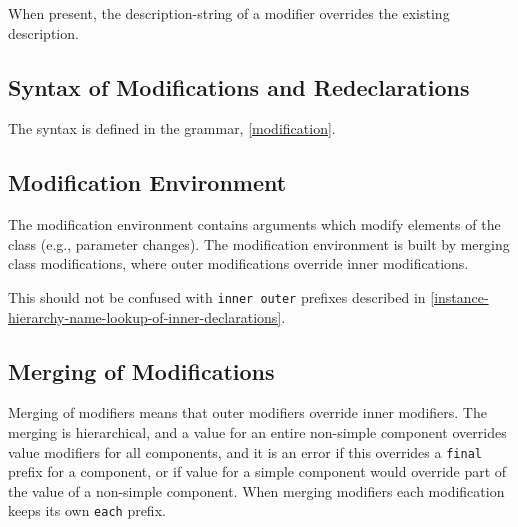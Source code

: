 When present, the description-string of a modifier overrides the existing description.

\subsection{Syntax of Modifications and Redeclarations}\label{syntax-of-modifications-and-redeclarations}

The syntax is defined in the grammar, \cref{modification}.

\subsection{Modification Environment}\label{modification-environment}

The modification environment contains arguments which modify elements of
the class (e.g., parameter changes). The modification environment is
built by merging class modifications, where outer modifications override
inner modifications.

\begin{nonnormative}
This should not be confused with \lstinline!inner outer! prefixes described in \cref{instance-hierarchy-name-lookup-of-inner-declarations}.
\end{nonnormative}

\subsection{Merging of Modifications}\label{merging-of-modifications}

Merging of modifiers means that outer modifiers override inner modifiers.  The merging is hierarchical, and a value for an entire non-simple component overrides value modifiers for all components, and it is an error if this overrides a \lstinline!final! prefix for a component, or if value for a simple component would override part of the value of a non-simple component. When merging modifiers each modification keeps its own \lstinline!each! prefix.


